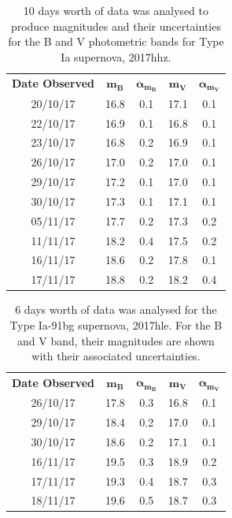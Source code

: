 \documentclass[twocolumn]{revtex4}
\begin{document}
\begin{table}[h!]
\centering
\begin{tabular}{c@{\hskip 20pt}c@{\hskip 20pt}c@{\hskip 20pt}c@{\hskip 20pt}c} 
 \hline
 \textbf{Date Observed} & \textbf{$\boldsymbol{m_B}$} & \textbf{$\boldsymbol{\alpha_{m_B}}$} & \textbf{$\boldsymbol{m_V}$} & \textbf{$\boldsymbol{\alpha_{m_V}}$} \\ [0.5ex] 
 20/10/17 & 16.8 & 0.1 & 17.1 & 0.1 \\
 22/10/17 & 16.9 & 0.1 & 16.8 & 0.1 \\
 23/10/17 & 16.8 & 0.2 & 16.9 & 0.1 \\
 26/10/17 & 17.0 & 0.2 & 17.0 & 0.1 \\
 29/10/17 & 17.2 & 0.1 & 17.0 & 0.1 \\
 30/10/17 & 17.3 & 0.1 & 17.1 & 0.1 \\
 05/11/17 & 17.7 & 0.2 & 17.3 & 0.2 \\
 11/11/17 & 18.2 & 0.4 & 17.5 & 0.2 \\
 16/11/17 & 18.6 & 0.2 & 17.8 & 0.1 \\
 17/11/17 & 18.8 & 0.2 & 18.2 & 0.4 \\
 \hline
\end{tabular}
\caption{10 days worth of data was analysed to produce magnitudes and their uncertainties for the B and V photometric bands for Type Ia supernova, 2017hhz. }
\vspace{-0.5em}
\label{table:2017hhz_data}
\end{table}

\begin{table}[h!]
\centering
\begin{tabular}{c@{\hskip 20pt}c@{\hskip 20pt}c@{\hskip 20pt}c@{\hskip 20pt}c} 
 \hline
 \textbf{Date Observed} & \textbf{$\boldsymbol{m_B}$} & \textbf{$\boldsymbol{\alpha_{m_B}}$} & \textbf{$\boldsymbol{m_V}$} & \textbf{$\boldsymbol{\alpha_{m_V}}$} \\ [0.5ex] 
 26/10/17 & 17.8 & 0.3 & 16.8 & 0.1 \\
 29/10/17 & 18.4 & 0.2 & 17.0 & 0.1 \\
 30/10/17 & 18.6 & 0.2 & 17.1 & 0.1 \\
 16/11/17 & 19.5 & 0.3 & 18.9 & 0.2 \\
 17/11/17 & 19.3 & 0.4 & 18.7 & 0.3 \\
 18/11/17 & 19.6 & 0.5 & 18.7 & 0.3 \\
 \hline
\end{tabular}
\caption{6 days worth of data was analysed for the Type Ia-91bg supernova, 2017hle. For the B and V band, their magnitudes are shown with their associated uncertainties.}
\vspace{-1.5em}
\label{table:2017hle_data}
\end{table}
\end{document}
